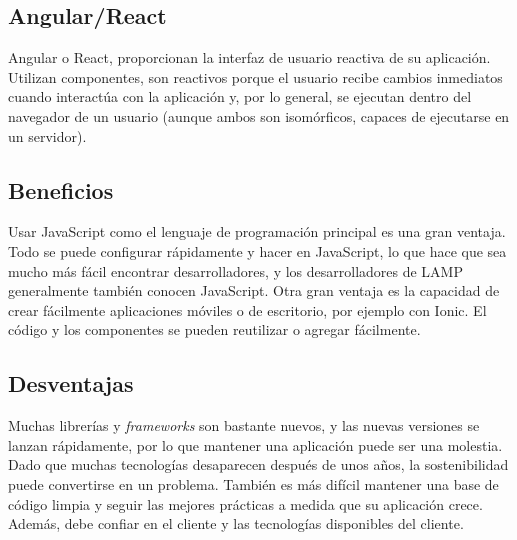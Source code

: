 \subsection{Angular/React}
Angular o React, proporcionan la interfaz de usuario reactiva de su aplicación. Utilizan componentes, son reactivos porque el usuario recibe cambios inmediatos cuando interactúa con la aplicación y, por lo general, se ejecutan dentro del navegador de un usuario (aunque ambos son isomórficos, capaces de ejecutarse en un servidor). \\[0.8cm]
\subsection{Beneficios}
Usar JavaScript como el lenguaje de programación principal es una gran ventaja. Todo se puede configurar rápidamente y hacer en JavaScript, lo que hace que sea mucho más fácil encontrar desarrolladores, y los desarrolladores de LAMP generalmente también conocen JavaScript. Otra gran ventaja es la capacidad de crear fácilmente aplicaciones móviles o de escritorio, por ejemplo con Ionic. El código y los componentes se pueden reutilizar o agregar fácilmente.
\subsection{Desventajas}
Muchas librerías y \textit{frameworks} son bastante nuevos, y las nuevas versiones se lanzan rápidamente, por lo que mantener una aplicación puede ser una molestia. Dado que muchas tecnologías desaparecen después de unos años, la sostenibilidad puede convertirse en un problema. También es más difícil mantener una base de código limpia y seguir las mejores prácticas a medida que su aplicación crece. Además, debe confiar en el cliente y las tecnologías disponibles del cliente.
